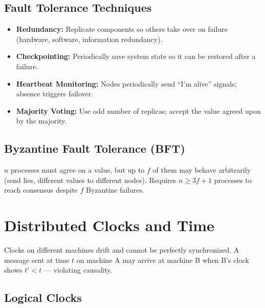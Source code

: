 \documentclass[11pt,a4paper]{article}
\begin{document}
\subsection{Fault Tolerance Techniques}
\begin{itemize}[leftmargin=*, itemsep=3pt]
  \item \textbf{Redundancy:} Replicate components so others take over on failure (hardware, software, information redundancy).
  \item \textbf{Checkpointing:} Periodically save system state so it can be restored after a failure.
  \item \textbf{Heartbeat Monitoring:} Nodes periodically send ``I'm alive'' signals; absence triggers failover.
  \item \textbf{Majority Voting:} Use odd number of replicas; accept the value agreed upon by the majority.
\end{itemize}

\subsection{Byzantine Fault Tolerance (BFT)}
\begin{conceptbox}
$n$ processes must agree on a value, but up to $f$ of them may behave arbitrarily (send lies, different values to different nodes). Requires $n \geq 3f + 1$ processes to reach consensus despite $f$ Byzantine failures.
\end{conceptbox}

\section{Distributed Clocks and Time}

\begin{conceptbox}
Clocks on different machines drift and cannot be perfectly synchronized. A message sent at time $t$ on machine A may arrive at machine B when B's clock shows $t' < t$ --- violating causality.
\end{conceptbox}

\subsection{Logical Clocks}
\end{document}
